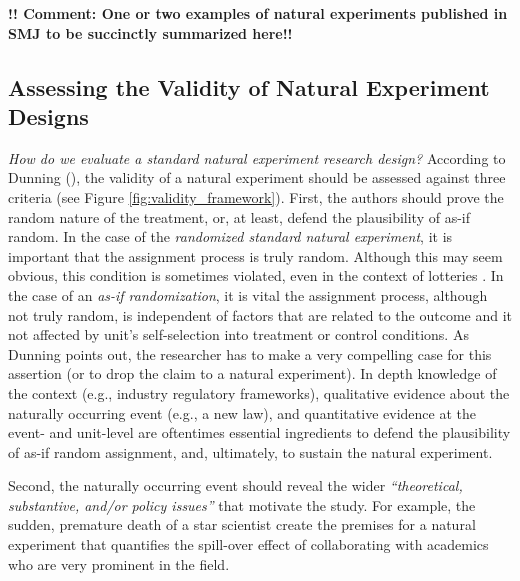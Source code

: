\documentclass[11pt, english]{article}
\begin{document}
\noindent \textbf{!! Comment: One or two examples of natural experiments
published in SMJ to be succinctly summarized here!!}

\subsection{Assessing the Validity of Natural Experiment Designs}
\label{sub:validity_framework}

\noindent\emph{How do we evaluate a standard natural experiment research
design?} According to Dunning (\cite*[][page 27]{Dunning2012}), the validity of
a natural experiment should be assessed against three criteria (see Figure
\ref{fig:validity_framework}).  First, the authors should prove the random
nature of the treatment, or, at least, defend the plausibility of as-if random.
In the case of the \emph{randomized standard natural experiment}, it is
important that the assignment process is truly random. Although this may seem
obvious, this condition is sometimes violated, even in the context of lotteries
\parencite[e.g.][]{Starr1997}. In the case of an \emph{as-if randomization}, it
is vital the assignment process, although not truly random, is independent of
factors that are related to the outcome and it not affected by unit's
self-selection into treatment or control conditions. As Dunning points out, the
researcher has to make a very compelling case for this assertion (or to drop the
claim to a natural experiment). In depth knowledge of the context (e.g.,
industry regulatory frameworks), qualitative evidence about the naturally
occurring event (e.g., a new law), and quantitative evidence at the event- and
unit-level are oftentimes essential ingredients to defend the plausibility of
as-if random assignment, and, ultimately, to sustain the natural experiment.

Second, the naturally occurring event should reveal the wider
\emph{``theoretical, substantive, and/or policy issues''} \parencite[][page
29]{Dunning2012} that motivate the study. For example, the sudden, premature
death of a star scientist \parencite[][]{Azoulay2010} create the premises for a
natural experiment that quantifies the spill-over effect of collaborating with
academics who are very prominent in the field.
\end{document}
